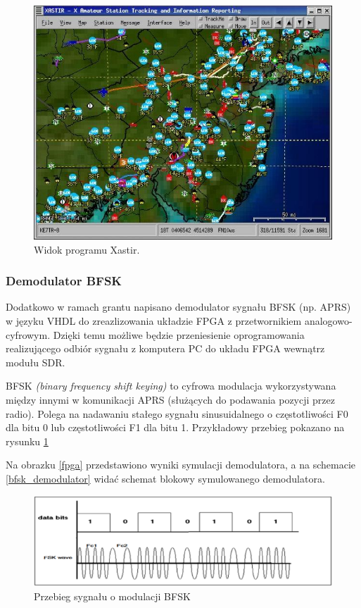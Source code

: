 \begin{figure}[!htbp]
 \includegraphics[width=\textwidth]{xastir}
 \centering
 \caption{Widok programu Xastir.}
\end{figure}

\subsubsection{Demodulator BFSK}

Dodatkowo w ramach grantu napisano demodulator sygnału BFSK (np. APRS) w języku VHDL do zreazlizowania układzie FPGA z przetwornikiem analogowo-cyfrowym. Dzięki temu możliwe będzie przeniesienie oprogramowania realizującego odbiór sygnału z komputera PC do układu FPGA wewnątrz modułu SDR. 

BFSK \emph{(binary frequency shift keying)} to cyfrowa modulacja wykorzystywana  między innymi w komunikacji APRS (służących do podawania pozycji przez radio). Polega na nadawaniu stałego sygnału sinusuidalnego o częstotliwości F0 dla bitu 0 lub częstotliwości F1 dla bitu 1. Przykładowy przebieg pokazano na rysunku \ref{bfsk}

Na obrazku \ref{fpga} przedstawiono wyniki symulacji demodulatora, a na schemacie \ref{bfsk_demodulator} widać schemat blokowy symulowanego demodulatora.


\begin{figure}[!htbp]
 \includegraphics[width=\textwidth]{bfsk}
 \centering
 \caption{Przebieg sygnału o modulacji BFSK}
 \label{bfsk}
\end{figure}


